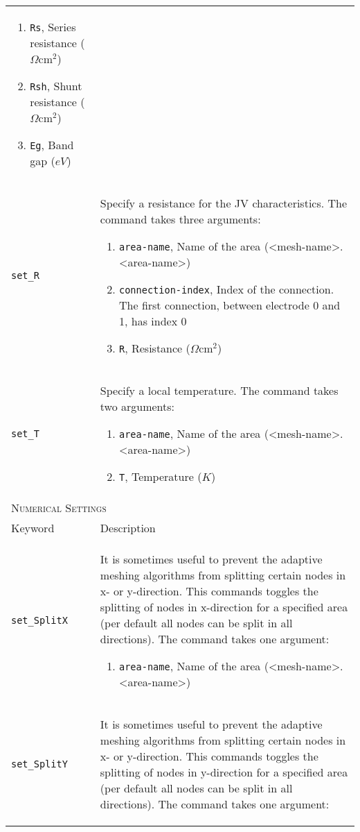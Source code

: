 \documentclass[noshowpacs,preprintnumbers,amsmath,amssymb, letter]{revtex4}
\begin{document}
\begin{longtable}{p{}p{}}
\begin{enumerate}
\item \texttt{Rs}, Series resistance ($\Omega \text{cm}^2$)
\item \texttt{Rsh}, Shunt resistance ($\Omega \text{cm}^2$)
\item \texttt{Eg}, Band gap ($eV$)
\end{enumerate}\\
\texttt{set\_R}	&  Specify a resistance for the JV characteristics. The command takes three arguments:
\begin{enumerate}
\item \texttt{area-name}, Name of the area (\textless mesh-name\textgreater .\textless area-name\textgreater )
\item \texttt{connection-index}, Index of the connection. The first connection, between electrode 0 and 1,  has index 0
\item \texttt{R}, Resistance ($\Omega \text{cm}^2$)
\end{enumerate}\\
\texttt{set\_T}	&  Specify a local temperature. The command takes two arguments:
\begin{enumerate}
\item \texttt{area-name}, Name of the area (\textless mesh-name\textgreater .\textless area-name\textgreater )
\item \texttt{T}, Temperature ($K$)
\end{enumerate}\\
\multicolumn{2}{l}{\textsc{Numerical Settings}} \\*
\hline
Keyword & Description \\
\texttt{set\_SplitX}	&  It is sometimes useful to prevent the adaptive meshing algorithms from splitting certain nodes in x- or y-direction. This commands toggles the splitting of nodes in x-direction for a specified area (per default all nodes can be split in all directions). The command takes one argument:
\begin{enumerate}
\item \texttt{area-name}, Name of the area (\textless mesh-name\textgreater .\textless area-name\textgreater )
\end{enumerate}\\
\texttt{set\_SplitY}	&  It is sometimes useful to prevent the adaptive meshing algorithms from splitting certain nodes in x- or y-direction. This commands toggles the splitting of nodes in y-direction for a specified area (per default all nodes can be split in all directions). The command takes one argument:
\begin{enumerate}

\end{enumerate}
\end{longtable}
\end{document}
